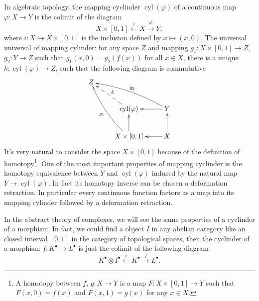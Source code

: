 In algebraic topology, the mapping cyclinder $\operatorname{cyl}(\varphi)$ of
a continuous map $\varphi:X\to Y$ is the colimit of the diagram
\[
	X\times [0,1] \xleftarrow{i} X \xrightarrow{\varphi} Y,
\]
where $i:X\hookrightarrow X\times [0,1]$ is the inclusion defined by $x\mapsto (x,0)$. 
The universal universal of mapping cylinder:
for any space $Z$ and mapping $g_1:X\times [0,1]\to Z$, $g_2:Y\to Z$ such that 
$g_1(x,0)=g_2(f(x))$ for all $x\in X$, there is a unique $k:\operatorname{cyl}(\varphi)\to Z$,
such that the following diagram is commutative
\[
	\xymatrix{
		Z &  & \\
		  & \operatorname{cyl}(\varphi)\ar@{-->}[ul]_k & Y\ar[l]\ar@/_/[llu]_{g_2}\\
		  & X\times [0,1]\ar[u]\ar@/^/[luu]^{g_1} & X\ar[u]\ar[l]
	}
\]
It's very natural to consider the space $X\times [0,1]$ because of the definition
of homotopy\footnote{A homotopy between $f$, $g:X\to Y$ is a map $F:X\times [0,1]\to Y$
such that $F(x,0)=f(x)$ and $F(x,1)=g(x)$ for any $x\in X$.}. 
One of the most important properties of mapping cyclinder is the homotopy equivalence between $Y$
and $\operatorname{cyl}(\varphi)$ induced by the natural map $Y\to \operatorname{cyl}(\varphi)$.
In fact its homotopy inverse can be chosen a deformation retraction. In particular every continuous function factors as a map into its mapping cylinder followed by a deformation retraction.

In the abstract theory of complexes, we will see the same properties of a cyclinder of a morphism.
In fact, we could find a object $I$ in any abelian category like an closed interval $[0,1]$ in the 
category of topological spaces, then the cyclinder of a morphism $f:K^\bullet \to L^\bullet$ 
is just the colimit of the following diagram 
\[
	K^\bullet\otimes I^\bullet \xleftarrow{i}K^\bullet \xrightarrow{f}L^\bullet.
\]

